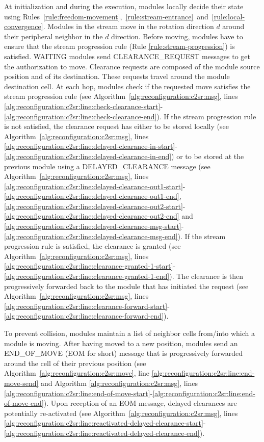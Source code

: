 At initialization and during the execution, modules locally decide their state using Rules~\ref{rule:freedom-movement},~\ref{rule:stream-entrance}~and~\ref{rule:local-convergence}. Modules in the stream move in the rotation direction $d$ around their peripheral neighbor in the $d$ direction. Before moving, modules have to ensure that the stream progression rule (Rule \ref{rule:stream-progression}) is satisfied. WAITING modules send CLEARANCE\_REQUEST messages to get the authorization to move. Clearance requests are composed of the module source position and of its destination. These requests travel around the module destination cell. At each hop, modules check if the requested move satisfies the stream progression rule (see Algorithm~\ref{alg:reconfiguration:c2sr:msg}, lines \ref{alg:reconfiguration:c2sr:line:check-clearance-start}-\ref{alg:reconfiguration:c2sr:line:check-clearance-end}). If the stream progression rule is not satisfied, the clearance request has either to be stored locally (see Algorithm~\ref{alg:reconfiguration:c2sr:msg}, lines \ref{alg:reconfiguration:c2sr:line:delayed-clearance-in-start}-\ref{alg:reconfiguration:c2sr:line:delayed-clearance-in-end}) or to be stored at the previous module using a DELAYED\_CLEARANCE message (see Algorithm~\ref{alg:reconfiguration:c2sr:msg}, lines \ref{alg:reconfiguration:c2sr:line:delayed-clearance-out1-start}-\ref{alg:reconfiguration:c2sr:line:delayed-clearance-out1-end}, \ref{alg:reconfiguration:c2sr:line:delayed-clearance-out2-start}-\ref{alg:reconfiguration:c2sr:line:delayed-clearance-out2-end} and \ref{alg:reconfiguration:c2sr:line:delayed-clearance-msg-start}-\ref{alg:reconfiguration:c2sr:line:delayed-clearance-msg-end}). If the stream progression rule is satisfied, the clearance is granted (see Algorithm~\ref{alg:reconfiguration:c2sr:msg}, lines \ref{alg:reconfiguration:c2sr:line:clearance-granted-1-start}-\ref{alg:reconfiguration:c2sr:line:clearance-granted-1-end}). The clearance is then progressively forwarded back to the module that has initiated the request (see Algorithm~\ref{alg:reconfiguration:c2sr:msg},  lines \ref{alg:reconfiguration:c2sr:line:clearance-forward-start}-\ref{alg:reconfiguration:c2sr:line:clearance-forward-end}). 

To prevent collision, modules maintain a list of neighbor cells from/into which a module is moving. After having moved to a new position, modules send an END\_OF\_MOVE (EOM for short) message that is progressively forwarded around the cell of their previous position (see Algorithm~\ref{alg:reconfiguration:c2sr:move}, line \ref{alg:reconfiguration:c2sr:line:end-move-send} and Algorithm \ref{alg:reconfiguration:c2sr:msg}, lines \ref{alg:reconfiguration:c2sr:line:end-of-move-start}-\ref{alg:reconfiguration:c2sr:line:end-of-move-end}). Upon reception of an EOM message, delayed clearances are potentially re-activated (see Algorithm~\ref{alg:reconfiguration:c2sr:msg}, lines \ref{alg:reconfiguration:c2sr:line:reactivated-delayed-clearance-start}-\ref{alg:reconfiguration:c2sr:line:reactivated-delayed-clearance-end}).

